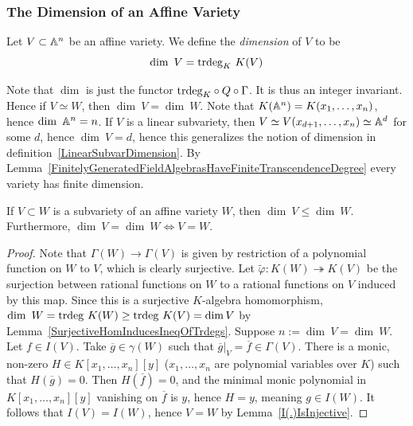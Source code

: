     \subsubsection{The Dimension of an Affine Variety}
    \begin{definition}
        Let $V\subset \mathbb{A}^n$ be an affine variety. We define the \textit{dimension} of $V$ to be 
        $$\dim\ V = \mathrm{trdeg }_K\ K(V)$$
    \end{definition}
    \begin{remark}
        Note that $\dim$ is just the functor $\mathrm{trdeg }_K\circ Q\circ \Gamma$. It is thus an integer invariant. Hence if $V\simeq W$, then $\dim \ V = \dim \ W$. Note that $K(\mathbb{A}^n)= K(x_1,\dots,x_n)$, hence $\dim\ \mathbb{A}^n = n$. If $V$ is a linear subvariety, then $V\simeq V(x_{d+1},\dots,x_n)\simeq \mathbb{A}^d$ for some  $d$, hence $\dim\ V = d$, hence this generalizes the notion of dimension in definition~\ref{LinearSubvarDimension}. By Lemma~\ref{FinitelyGeneratedFieldAlgebrasHaveFiniteTranscendenceDegree} every variety has finite dimension. 
    \end{remark}
    \begin{lemma}\label{SubvarietyHasSmallerDimension}
        If $V \subset W$ is a subvariety of an affine variety $W$, then $\dim\ V\leq \dim \ W$. Furthermore, $\dim\ V =\dim \ W\iff V=W$.
    \end{lemma}
    \begin{proof}
        Note that $\Gamma(W)\rightarrow \Gamma(V)$ is given by restriction of a polynomial function on $W$ to $V$, which is clearly surjective. Let $\widetilde{\varphi} : K(W)\twoheadrightarrow K(V)$ be the surjection between rational functions on $W$ to a rational functions on $V$ induced by this map. Since this is a surjective $K$-algebra homomorphism, $\dim\ W= \mathrm{trdeg }\ K(W) \geq \mathrm{trdeg } \ K(V) = \dim V$ by Lemma~\ref{SurjectiveHomInducesIneqOfTrdegs}. Suppose $n:=\dim \ V = \dim \ W$. Let $f\in I(V)$. Take $\overline{g}\in \gamma(W)$ such that $\left.\overline{g}\right|_V=\overline{f}\in \Gamma(V)$. There is a monic, non-zero $H\in K[x_1,\dots,x_n][y]$ ($x_1,\dots,x_n$ are polynomial variables over $K$) such that $H(\overline{g})=0$. Then $H(\overline{f})=0$, and the minimal monic polynomial in $K[x_1,\dots,x_n][y]$ vanishing on $\overline{f}$ is $y$, hence $H=y$, meaning $g\in I(W)$. It follows that $I(V)=I(W)$, hence $V=W$ by Lemma~\ref{I(.)IsInjective}.
    \end{proof}    
